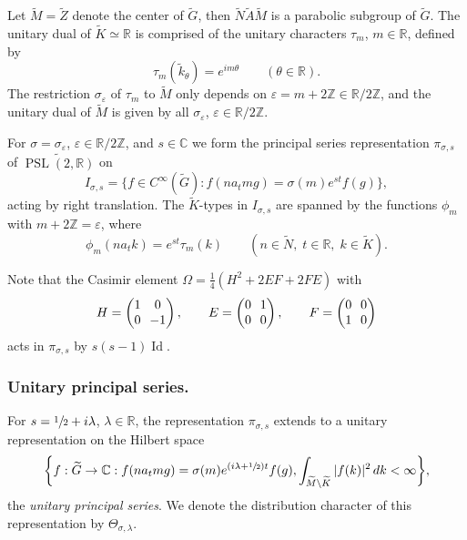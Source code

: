 \documentclass[JEP,XML,SOM,Unicode,NoFloatCountersInSection,published]{cedram}
\theoremstyle{plain}
\theoremstyle{definition}
\theoremstyle{remark}
\newcommand{\R}{\mathbb{R}}
\newcommand{\Z}{\mathbb{Z}}
\newcommand{\C}{\mathbb{C}}
\DeclareMathOperator{\PSL}{PSL}
\DeclareMathOperator{\Id}{Id}
\numberwithin{equation}{section}
\begin{document}
Let $\widetilde{M}=\widetilde{Z}$ denote the center of $\widetilde{G}$, then $\widetilde{N}\widetilde{A}\widetilde{M}$ is a parabolic subgroup of $\widetilde{G}$. The unitary dual of $\widetilde{K}\simeq\R$ is comprised of the unitary characters $\tau_m$, $m\in\R$, defined by
\begin{equation}
\tau_m(\widetilde{k}_\theta) = e^{im\theta} \qquad (\theta\in\R).\label{eq:DefTauM}
\end{equation}
The restriction $\sigma_\varepsilon$ of $\tau_m$ to $\widetilde{M}$ only depends on $\varepsilon=m+2\Z\in\R/2\Z$, and the unitary dual of $\widetilde{M}$ is given by all $\sigma_\varepsilon$, $\varepsilon\in\R/2\Z$.

For $\sigma=\sigma_\varepsilon$, $\varepsilon\in\R/2\Z$, and $s\in\C$ we form the principal series representation $\pi_{\sigma,s}$ of $\widetilde{\PSL(2,\R)}$ on
\[
I_{\sigma,s} = \{f\in C^\infty(\widetilde{G}):f(na_tmg)=\sigma(m)e^{st}f(g)\},
\]
acting by right translation. The $\widetilde{K}$-types in $I_{\sigma,s}$ are spanned by the functions $\phi_m$ with $m+2\Z=\varepsilon$, where
\[
\phi_m(na_tk) = e^{st}\tau_m(k) \qquad (n\in\widetilde{N},\;t\in\R,\;k\in\widetilde{K}).
\]

Note that the Casimir element $\Omega=\frac{1}{4}(H^2+2EF+2FE)$ with
\[\arraycolsep3.5pt
H=\begin{pmatrix}1&0\\0&-1\end{pmatrix}, \qquad E=\begin{pmatrix}0&1\\0&0\end{pmatrix}, \qquad F=\begin{pmatrix}0&0\\1&0\end{pmatrix}
\]
acts in $\pi_{\sigma,s}$ by $s(s-1)\Id$.

\subsubsection*{Unitary principal series.} For $s=\sfrac{1}{2}+i\lambda$, $\lambda\in\R$, the representation $\pi_{\sigma,s}$ extends to a unitary representation on the Hilbert space
\[
\biggl\{f:\widetilde{G}\rightarrow\C:f(na_tmg)=\sigma(m)e^{(i\lambda+\sfrac{1}{2})t}f(g),\int_{\widetilde{M}\backslash\widetilde{K}}|f(k)|^2\,dk<\infty\biggr\},
\]
the \emph{unitary principal series}. We denote the distribution character of this representation by $\Theta_{\sigma,\lambda}$.
\end{document}

